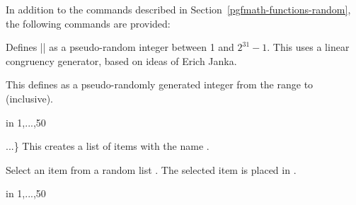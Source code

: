 In addition to the commands described in
Section~\ref{pgfmath-functions-random}, the following commands are provided:

\begin{command}{\pgfmathgeneratepseudorandomnumber}
    Defines |\pgfmathresult| as a pseudo-random integer between 1 and
    $2^{31}-1$. This uses a linear congruency generator, based on ideas of
    Erich Janka.
\end{command}

\begin{command}{\pgfmathrandominteger{}}
    This defines  as a pseudo-randomly generated integer from the
    range  to  (inclusive).
\begin{codeexample}[]
\begin{pgfpicture}
   \foreach \x in {1,...,50}{
      \color{blue!40!white}
   }
\end{pgfpicture}
\end{codeexample}
\end{command}

\begin{command}{\pgfmathdeclarerandomlist{}...{\ttfamily\}}}
    This creates a list of items with the name .
\end{command}

\begin{command}{\pgfmathrandomitem{}}
    Select an item from a random list . The
    selected item is placed in .
\end{command}

\begin{codeexample}[]
\begin{pgfpicture}
   \foreach \a in {1,...,50}{
      \color{\c!40!white}
   }
\end{pgfpicture}
\end{codeexample}

